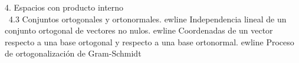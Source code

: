 \documentclass[preview]{standalone}
\begin{document}
\begin{center}
4. Espacios con producto interno \\\ 4.3 Conjuntos ortogonales y ortonormales. 
ewline  Independencia lineal de un conjunto ortogonal de vectores no nulos. 
ewline Coordenadas de un vector respecto a una base ortogonal y respecto a una base ortonormal. 
ewline Proceso de ortogonalización de Gram-Schmidt
\end{center}
\end{document}
